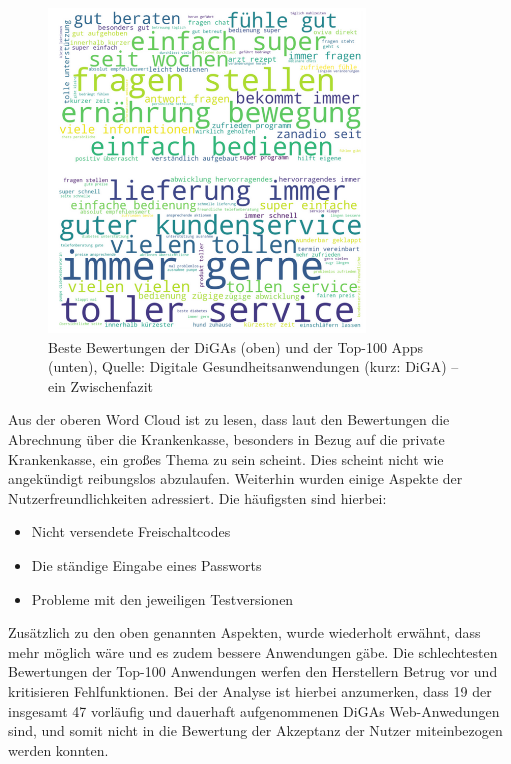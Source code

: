\documentclass{article}
\begin{document}
			\begin{figure}[htbp]
				\centering
				\includegraphics[width=0.75\textwidth]{./grafiken/word_cloud}
				\caption[Wordcloud von DiGAs und Top-100 Anwendungen]{Beste Bewertungen der DiGAs (oben) und der Top-100 Apps (unten), Quelle: Digitale Gesundheitsanwendungen (kurz: DiGA) – ein Zwischenfazit \cite{frauenhofinstitut}}
				\label{Abb-word-cloud}
			\end{figure}   
			Aus der oberen Word Cloud ist zu lesen, dass laut den Bewertungen die Abrechnung über die Krankenkasse, besonders in Bezug auf die private Krankenkasse, ein großes Thema zu sein scheint. Dies scheint nicht wie angekündigt reibungslos abzulaufen. Weiterhin wurden einige Aspekte der Nutzerfreundlichkeiten adressiert. Die häufigsten sind hierbei:
			\begin{itemize}
				\item Nicht versendete Freischaltcodes
				\item Die ständige Eingabe eines Passworts
				\item Probleme mit den jeweiligen Testversionen 
			\end{itemize} 
			Zusätzlich zu den oben genannten Aspekten, wurde wiederholt erwähnt, dass mehr möglich wäre und es zudem bessere Anwendungen gäbe. Die schlechtesten Bewertungen der Top-100 Anwendungen werfen den Herstellern Betrug vor und kritisieren Fehlfunktionen. Bei der Analyse ist hierbei anzumerken, dass 19 der insgesamt 47 vorläufig und dauerhaft aufgenommenen DiGAs Web-Anwedungen sind, und somit nicht in die Bewertung der Akzeptanz der Nutzer miteinbezogen werden konnten.\par
\end{document}

